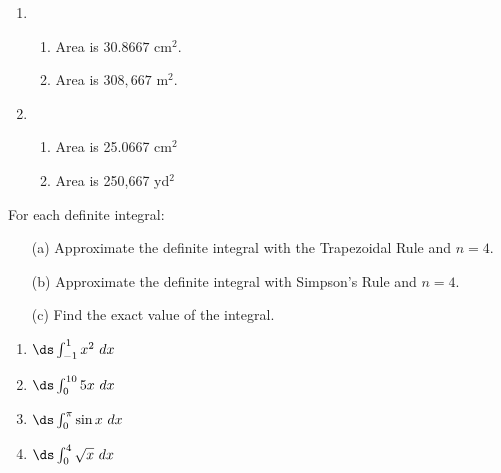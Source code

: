 \begin{enumialphparenastyle}
\begin{ex}
\begin{enumerate}
\end{enumerate}

\begin{sol}
\begin{enumerate}
\item {\begin{enumerate}
\item		Area is $30.8667$ cm$^2$.
\item		Area is $308,667$ m$^2$.
\end{enumerate}
}

\item {\begin{enumerate}
\item		Area is 25.0667 cm$^2$
\item		Area is 250,667 yd$^2$
\end{enumerate}
}

\end{enumerate}
\end{sol}
\end{ex}


\begin{ex}
{For each definite integral: 
\begin{enumerate}
\item	[(a)] Approximate the definite integral with the Trapezoidal Rule and $n=4$.
\item	[(b)] Approximate the definite integral with Simpson's Rule and $n=4$.
\item	[(c)] Find the exact value of the integral.
\end{enumerate}
}
\begin{enumerate}
\item {$\ds \int_{-1}^1 x^2\ dx$}

\item {$\ds \int_{0}^{10} 5x\ dx$}

\item {$\ds \int_{0}^{\pi} \sin x\ dx$}

\item {$\ds \int_{0}^{4} \sqrt x\ dx$}


\end{enumerate}
\end{ex}
\end{enumialphparenastyle}
